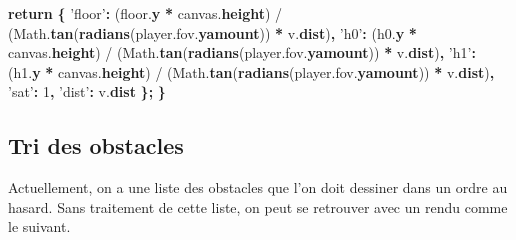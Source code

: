 \documentclass[11pt,french,a4paper,]{article}
\newenvironment{Shaded}{\begin{snugshade}}{\end{snugshade}}
\newcommand{\AttributeTok}[1]{\textcolor[rgb]{0.00,0.36,0.77}{\textbf{#1}}}
\newcommand{\ControlFlowTok}[1]{\textcolor[rgb]{0.68,0.35,0.62}{\textbf{#1}}}
\newcommand{\DecValTok}[1]{\textcolor[rgb]{0.00,0.00,0.81}{#1}}
\newcommand{\NormalTok}[1]{#1}
\newcommand{\OperatorTok}[1]{\textcolor[rgb]{0.81,0.36,0.00}{\textbf{#1}}}
\newcommand{\StringTok}[1]{\textcolor[rgb]{0.31,0.60,0.02}{#1}}
\newcommand{\VariableTok}[1]{\textcolor[rgb]{0.90,0.33,0.00}{#1}}
\begin{document}
\begin{Shaded}
\begin{Highlighting}[]
    \ControlFlowTok{return} \OperatorTok{\{}
        \StringTok{'floor'}\OperatorTok{:}\NormalTok{ (}\VariableTok{floor}\NormalTok{.}\AttributeTok{y} \OperatorTok{*} \VariableTok{canvas}\NormalTok{.}\AttributeTok{height}\NormalTok{)}
\NormalTok{                    / (}\VariableTok{Math}\NormalTok{.}\AttributeTok{tan}\NormalTok{(}\AttributeTok{radians}\NormalTok{(}\VariableTok{player}\NormalTok{.}\VariableTok{fov}\NormalTok{.}\AttributeTok{yamount}\NormalTok{)) }\OperatorTok{*} \VariableTok{v}\NormalTok{.}\AttributeTok{dist}\NormalTok{)}\OperatorTok{,}
        \StringTok{'h0'}\OperatorTok{:}\NormalTok{    (}\VariableTok{h0}\NormalTok{.}\AttributeTok{y} \OperatorTok{*} \VariableTok{canvas}\NormalTok{.}\AttributeTok{height}\NormalTok{)}
\NormalTok{                    / (}\VariableTok{Math}\NormalTok{.}\AttributeTok{tan}\NormalTok{(}\AttributeTok{radians}\NormalTok{(}\VariableTok{player}\NormalTok{.}\VariableTok{fov}\NormalTok{.}\AttributeTok{yamount}\NormalTok{)) }\OperatorTok{*} \VariableTok{v}\NormalTok{.}\AttributeTok{dist}\NormalTok{)}\OperatorTok{,}
        \StringTok{'h1'}\OperatorTok{:}\NormalTok{    (}\VariableTok{h1}\NormalTok{.}\AttributeTok{y} \OperatorTok{*} \VariableTok{canvas}\NormalTok{.}\AttributeTok{height}\NormalTok{)}
\NormalTok{                    / (}\VariableTok{Math}\NormalTok{.}\AttributeTok{tan}\NormalTok{(}\AttributeTok{radians}\NormalTok{(}\VariableTok{player}\NormalTok{.}\VariableTok{fov}\NormalTok{.}\AttributeTok{yamount}\NormalTok{)) }\OperatorTok{*} \VariableTok{v}\NormalTok{.}\AttributeTok{dist}\NormalTok{)}\OperatorTok{,}
        \StringTok{'sat'}\OperatorTok{:} \DecValTok{1}\OperatorTok{,}
        \StringTok{'dist'}\OperatorTok{:} \VariableTok{v}\NormalTok{.}\AttributeTok{dist}
    \OperatorTok{\};}
\OperatorTok{\}}
\end{Highlighting}
\end{Shaded}

\hypertarget{tri-des-obstacles}{%
\subsection{Tri des obstacles}\label{tri-des-obstacles}}

Actuellement, on a une liste des obstacles que l'on doit dessiner dans
un ordre au hasard. Sans traitement de cette liste, on peut se retrouver
avec un rendu comme le suivant.
\end{document}
